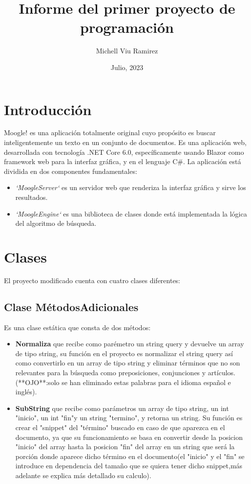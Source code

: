 \documentclass{article}
\begin{document}
\title{Informe del primer proyecto de programación}
\author{Michell Viu Ramirez}
\date{Julio, 2023}
\maketitle
\newpage
\tableofcontents
\newpage
\section{Introducción}
Moogle! es una aplicación totalmente original cuyo propósito es buscar inteligentemente un texto en un conjunto de documentos.
Es una aplicación web, desarrollada con tecnología .NET Core 6.0, específicamente usando Blazor como framework web para la interfaz gráfica, y en el lenguaje C\#. 
La aplicación está dividida en dos componentes fundamentales:
\begin{itemize}
    \item \textit{`MoogleServer`} es un servidor web que renderiza la interfaz gráfica y sirve los resultados.
    \item \textit{`MoogleEngine`} es una biblioteca de clases donde está implementada la lógica del algoritmo de búsqueda.
\end{itemize}
\section{Clases}
El proyecto modificado cuenta con cuatro clases diferentes:
\subsection{Clase MétodosAdicionales}
Es una clase estática que consta de dos métodos:
\begin{itemize}
    \item \textbf{Normaliza} que recibe como parémetro un string query y devuelve un array de tipo string, 
    su función en el proyecto es normalizar el string query así como convertirlo en un array de tipo string y 
    eliminar términos que no son relevantes para la búsqueda como preposiciones, conjunciones y artículos. 
    (**OJO**:solo se han eliminado estas palabras para el idioma español e inglés).
    \item \textbf{SubString}  que recibe como parámetros un array de tipo string, un int "inicio", un int "fin"y un string "termino",
     y retorna un string. Su función es crear el "snippet" del "término" buscado en caso de que aparezca en el documento, ya que su 
     funcionamiento se basa en convertir desde la posicion "inicio" del array hasta la posicion "fin" del array en un string que será 
     la porción donde aparece dicho término en el documento(el "inicio" y el "fin" se introduce en dependencia del tamaño que se quiera 
     tener dicho snippet,más adelante se explica más detallado su calculo).
\end{itemize}
\end{document}
